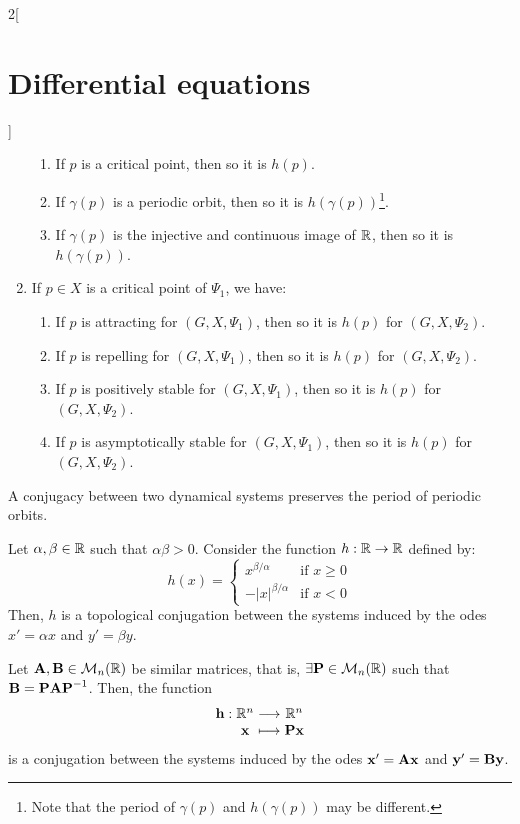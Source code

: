 \documentclass[../../../main.tex]{subfiles}
\begin{document}
\begin{multicols}{2}[\section{Differential equations}]
\begin{proposition}
\begin{enumerate}
            \begin{enumerate}
              \item If $p$ is a critical point, then so it is $h(p)$.
              \item If $\gamma(p)$ is a periodic orbit, then so it is $h(\gamma(p))$\footnote{Note that the period of $\gamma(p)$ and $h(\gamma(p))$ may be different.}.
              \item If $\gamma(p)$ is the injective and continuous image of $\mathbb{R}$, then so it is $h(\gamma(p))$.
            \end{enumerate}
      \item If $p\in X$ is a critical point of $\Psi_1$, we have:
            \begin{enumerate}
              \item If $p$ is attracting for $(G,X,\Psi_1)$, then so it is $h(p)$ for $(G,X,\Psi_2)$.
              \item If $p$ is repelling for $(G,X,\Psi_1)$, then so it is $h(p)$ for $(G,X,\Psi_2)$.
              \item If $p$ is positively stable for $(G,X,\Psi_1)$, then so it is $h(p)$ for $(G,X,\Psi_2)$.
              \item If $p$ is asymptotically stable for $(G,X,\Psi_1)$, then so it is $h(p)$ for $(G,X,\Psi_2)$.
            \end{enumerate}
    \end{enumerate}
  \end{proposition}
  \begin{proposition}
    A conjugacy between two dynamical systems preserves the period of periodic orbits.
  \end{proposition}
  \begin{proposition}
    Let $\alpha,\beta\in\mathbb{R}$ such that $\alpha\beta>0$. Consider the function $h:\mathbb{R}\rightarrow\mathbb{R}$ defined by: $$h(x)=
      \begin{cases}
        x^{\beta/\alpha}      & \text{if }x\geq 0 \\
        -{|x|}^{\beta/\alpha} & \text{if }x< 0
      \end{cases}$$
    Then, $h$ is a topological conjugation between the systems induced by the odes $x'=\alpha x$ and $y'=\beta y$.
  \end{proposition}
  \begin{proposition}
    Let $\boldsymbol{\mathrm{A}},\boldsymbol{\mathrm{B}}\in\mathcal{M}_n(\mathbb{R})$ be similar matrices, that is, $\exists\boldsymbol{\mathrm{P}}\in\mathcal{M}_n(\mathbb{R})$ such that $\boldsymbol{\mathrm{B}}=\boldsymbol{\mathrm{P}}\boldsymbol{\mathrm{A}}\boldsymbol{\mathrm{P}}^{-1}$. Then, the function $$\function{\vf{h}}{\RR^n}{\RR^n}{\vf{x}}{\vf{Px}}$$ is a conjugation between the systems induced by the odes $\boldsymbol{\mathrm{x}}'=\boldsymbol{\mathrm{A}}\boldsymbol{\mathrm{x}}$ and $\boldsymbol{\mathrm{y}}'=\boldsymbol{\mathrm{B}}\boldsymbol{\mathrm{y}}$.
  \end{proposition}

\end{multicols}
\end{document}
